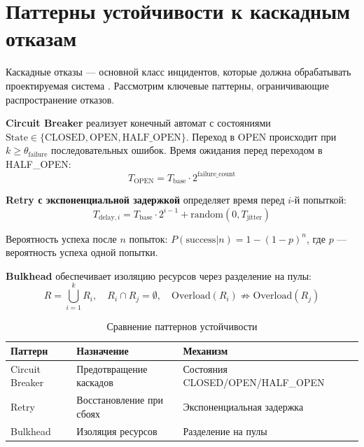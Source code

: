 \section{Паттерны устойчивости к каскадным отказам}

Каскадные отказы --- основной класс инцидентов, которые должна обрабатывать проектируемая система \cite{circuit_breaker_pattern,retry_pattern}. Рассмотрим ключевые паттерны, ограничивающие распространение отказов.

\textbf{Circuit Breaker} реализует конечный автомат с состояниями $\text{State} \in \{\text{CLOSED}, \text{OPEN}, \text{HALF\_OPEN}\}$. Переход в OPEN происходит при $k \geq \theta_{\text{failure}}$ последовательных ошибок. Время ожидания перед переходом в HALF\_OPEN:
\begin{equation}
T_{\text{OPEN}} = T_{\text{base}} \cdot 2^{\text{failure\_count}}
\label{eq:circuit_breaker_timeout}
\end{equation}

\textbf{Retry с экспоненциальной задержкой} определяет время перед $i$-й попыткой:
\begin{equation}
T_{\text{delay},i} = T_{\text{base}} \cdot 2^{i-1} + \text{random}(0, T_{\text{jitter}})
\label{eq:exponential_backoff}
\end{equation}

Вероятность успеха после $n$ попыток: $P(\text{success}|n) = 1 - (1 - p)^n$, где $p$ --- вероятность успеха одной попытки.

\textbf{Bulkhead} обеспечивает изоляцию ресурсов через разделение на пулы:
\begin{equation}
R = \bigcup_{i=1}^{k} R_i, \quad R_i \cap R_j = \emptyset, \quad \text{Overload}(R_i) \not\Rightarrow \text{Overload}(R_j)
\label{eq:bulkhead}
\end{equation}

\begin{table}[H]
\centering
\small
\caption{Сравнение паттернов устойчивости}
\label{tab:resilience_patterns}
\begin{tabular}{|>{\raggedright\arraybackslash}p{2.5cm}|>{\raggedright\arraybackslash}p{4cm}|>{\raggedright\arraybackslash}p{4cm}|}
\hline
Паттерн & Назначение & Механизм \\
\hline
Circuit Breaker & Предотвращение каскадов & Состояния CLOSED/OPEN/HALF\_OPEN \\
\hline
Retry & Восстановление при сбоях & Экспоненциальная задержка \\
\hline
Bulkhead & Изоляция ресурсов & Разделение на пулы \\
\hline
\end{tabular}
\end{table}

